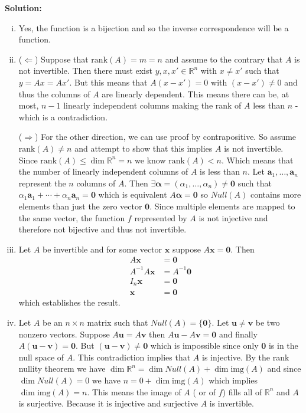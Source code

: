 \documentclass[a4paper,11pt]{article}
\newenvironment{solution}{ \noindent \textbf{Solution: \medskip}}{}
\begin{document}
\begin{solution}
\begin{enumerate}[(i)]
	\item Yes, the function is a bijection and so the inverse correspondence will be a function.
	\item ($\Leftarrow$) Suppose that $\text{rank}(A)=m=n$ and assume to the contrary that $A$ is not invertible.
	Then there must exist $y,x,x' \in \mathbb{R}^n$ with $x\neq x'$ such that $y=Ax=Ax'$.
	But this means that $A(x-x')=0$ with $(x-x')\neq 0$ and thus the columns of $A$ are linearly dependent. This means there can be, at most, $n-1$ linearly independent columns making the rank of $A$ less than $n$ - which is a contradiction.
	
	($\Rightarrow$) For the other direction, we can use proof by contrapositive.
	So assume $\text{rank}(A) \neq n$ and attempt to show that this implies $A$ is not invertible.
	Since $\text{rank}(A) \leq \dim \mathbb{R}^n = n$ we know $\text{rank}(A) < n$.
	Which means that the number of linearly independent columns of $A$ is less than $n$.
	Let $\mathbf{a}_1, \dots, \mathbf{a}_n$ represent the $n$ columns of $A$.
	Then $\exists \boldsymbol{\alpha} = (\alpha_1, \dots, \alpha_n) \neq \mathbf{0}$ such that $\alpha_1 \mathbf{a}_1 + \cdots + \alpha_n \mathbf{a}_n = \mathbf{0}$ which is equivalent $A \boldsymbol{\alpha} = \mathbf{0}$ so $Null(A)$ contains more elements than just the zero vector $\mathbf{0}$.
	Since multiple elements are mapped to the same vector, the function $f$ represented by $A$ is not injective and therefore not bijective and thus not invertible. \qedsymbol
	\item Let $A$ be invertible and for some vector $\mathbf{x}$ suppose $A\mathbf{x} = \mathbf{0}$.
	Then
	\begin{align}
		A\mathbf{x} &= \mathbf{0} \nonumber \\
		A^{-1} A \mathbf{x} &= A^{-1} \mathbf{0} \nonumber \\
		I_{n} \mathbf{x} &= \mathbf{0} \nonumber \\
		\mathbf{x} &= \mathbf{0} \nonumber
	\end{align}
	which establishes the result. \qedsymbol
	\item Let $A$ be an $n\times n$ matrix such that $Null(A) = \{\mathbf{0}\}$.
	Let $\mathbf{u} \neq \mathbf{v}$ be two nonzero vectors.
	Suppose $A \mathbf{u} = A \mathbf{v}$ then $A \mathbf{u} - A \mathbf{v} = \mathbf{0}$ and finally $A(\mathbf{u} - \mathbf{v}) = \mathbf{0}$.
	But $(\mathbf{u}-\mathbf{v})\neq \mathbf{0}$ which is impossible since only $\mathbf{0}$ is in the null space of $A$.
	This contradiction implies that $A$ is injective.
	By the rank nullity theorem we have $\dim \mathbb{R}^n = \dim Null(A) + \dim \text{img}(A)$ and since $\dim Null(A) = 0$ we have $n = 0 + \dim \text{img}(A)$ which implies $\dim \text{img}(A) = n$.
	This means the image of $A$ ( or of $f$) fills all of $\mathbb{R}^n$ and $A$ is surjective.
	Because it is injective and surjective $A$ is invertible. \qedsymbol 
\end{enumerate}
\end{solution}
\end{document}
